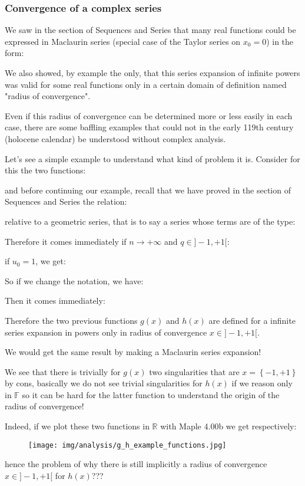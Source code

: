 	\pagebreak
	\subsubsection{Convergence of a complex series}
	We saw in the section of Sequences and Series that many real functions could be expressed in Maclaurin series (special case of the Taylor series on $x_0=0$) in the form:
	
	We also showed, by example the only, that this series expansion of infinite powers was valid for some real functions only in a certain domain of definition named "radius of convergence".
	
	Even if this radius of convergence can be determined more or less easily in each case, there are some baffling examples that could not in the early 119th century (holocene calendar) be understood without complex analysis.
	
	Let's see a simple example to understand what kind of problem it is. Consider for this the two functions:
	
	and before continuing our example, recall that we have proved in the section of Sequences and Series the relation:
	
	relative to a geometric series, that is to say a series whose terms are of the type:
	
	Therefore it comes immediately if $n \rightarrow +\infty$ and $q \in ]-1,+1[$:
	
	if $u_0=1$, we get:
	
	So if we change the notation, we have\label{sum of powers}:
	
	Then it comes immediately:
	
	Therefore the two previous functions $g(x)$ and $h(x)$ are defined for a infinite series expansion in powers only in radius of convergence $x \in ]-1,+1[$.
	
	We would get the same result by making a Maclaurin series expansion!
	
	We see that there is trivially for $g(x)$ two singularities that are $x=\left\lbrace -1,+1\right\rbrace$ by cons, basically we do not see trivial singularities for $h (x)$ if we reason only in $\mathbb{F}$ so it can be hard for the latter function to understand the origin of the radius of convergence!
	
	Indeed, if we plot these two functions in $\mathbb{R}$ with Maple 4.00b we get respectively:
	\begin{figure}[H]
		\begin{center}
			\texttt{[image: img/analysis/g\_h\_example\_functions.jpg]}
		\end{center}
	\end{figure}
	hence the problem of why there is still implicitly a radius of convergence $x \in ]-1,+1[$ for $h (x)$???
	
